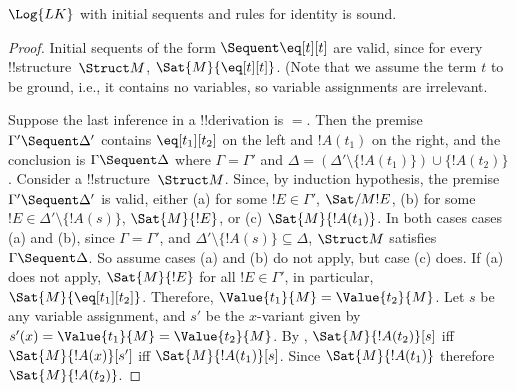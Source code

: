\documentclass[../../include/open-logic-section]{subfiles}
\begin{document}
\begin{prop}
$\Log{LK}$ with initial sequents and rules for identity is sound.
\end{prop}

\begin{proof}
Initial sequents of the form ${} \Sequent \eq[t][t]$ are valid, since
for every !!{structure}~$\Struct M$, $\Sat{M}{\eq[t][t]}$. (Note that
we assume the term $t$ to be ground, i.e., it contains no variables,
so variable assignments are irrelevant.

Suppose the last inference in a !!{derivation} is $=$. Then the
premise $\Gamma' \Sequent \Delta'$ contains $\eq[t_1][t_2]$ on the left
and $!A(t_1)$ on the right, and the conclusion is $\Gamma \Sequent
\Delta$ where $\Gamma = \Gamma'$ and $\Delta = (\Delta' \setminus
\{!A(t_1)\}) \cup \{!A(t_2)\}$. Consider a !!{structure}~$\Struct
M$. Since, by induction hypothesis, the premise $\Gamma' \Sequent
\Delta'$ is valid, either (a) for some $!E \in \Gamma'$,
$\Sat/{M}{!E}$, (b) for some $!E \in \Delta' \setminus \{!A(s)\}$,
$\Sat{M}{!E}$, or (c) $\Sat{M}{!A(t_1)}$.  In both cases cases (a) and
(b), since $\Gamma = \Gamma'$, and $\Delta' \setminus \{!A(s)\}
\subseteq \Delta$, $\Struct M$ satisfies $\Gamma \Sequent \Delta$. So
assume cases (a) and (b) do not apply, but case (c) does.  If (a) does
not apply, $\Sat{M}{!E}$ for all $!E \in \Gamma'$, in particular,
$\Sat{M}{\eq[t_1][t_2]}$.  Therefore, $\Value{t_1}{M} = \Value{t_2}{M}$.  Let
$s$ be any variable assignment, and $s'$ be the $x$-variant given by
$s'(x) = \Value{t_1}{M} = \Value{t_2}{M}$. By
, $\Sat{M}{!A(t_2)}[s]$ iff
$\Sat{M}{!A(x)}[s']$ iff $\Sat{M}{!A(t_1)}[s]$. Since $\Sat{M}{!A(t_1)}$
therefore $\Sat{M}{!A(t_2)}$.
\end{proof}
\end{document}
